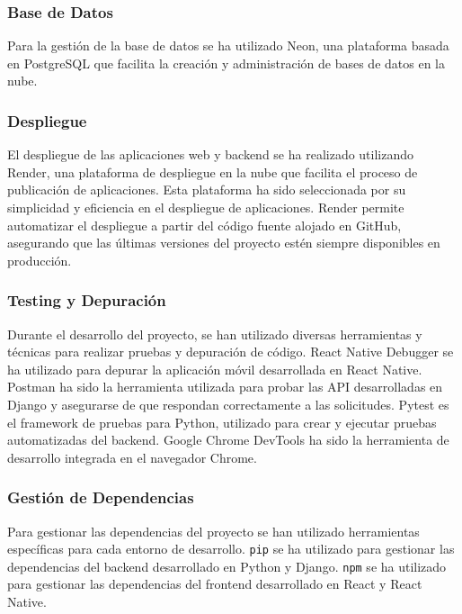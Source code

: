 \subsubsection{Base de Datos}

Para la gestión de la base de datos se ha utilizado Neon, una plataforma basada en PostgreSQL que facilita la creación y administración de bases de datos en la nube.

\subsubsection{Despliegue}

El despliegue de las aplicaciones web y backend se ha realizado utilizando Render, una plataforma de despliegue en la nube que facilita el proceso de publicación de aplicaciones. Esta plataforma ha sido seleccionada por su simplicidad y eficiencia en el despliegue de aplicaciones. Render permite automatizar el despliegue a partir del código fuente alojado en GitHub, asegurando que las últimas versiones del proyecto estén siempre disponibles en producción.

\subsubsection{Testing y Depuración}

Durante el desarrollo del proyecto, se han utilizado diversas herramientas y técnicas para realizar pruebas y depuración de código. React Native Debugger se ha utilizado para depurar la aplicación móvil desarrollada en React Native. Postman ha sido la herramienta utilizada para probar las API desarrolladas en Django y asegurarse de que respondan correctamente a las solicitudes. Pytest es el framework de pruebas para Python, utilizado para crear y ejecutar pruebas automatizadas del backend. Google Chrome DevTools ha sido la herramienta de desarrollo integrada en el navegador Chrome.

\subsubsection{Gestión de Dependencias}

Para gestionar las dependencias del proyecto se han utilizado herramientas específicas para cada entorno de desarrollo. \texttt{pip} se ha utilizado para gestionar las dependencias del backend desarrollado en Python y Django. \texttt{npm} se ha utilizado para gestionar las dependencias del frontend desarrollado en React y React Native.